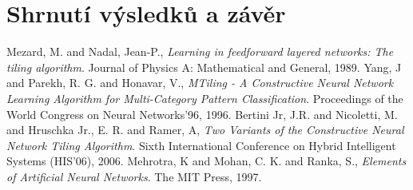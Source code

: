 \documentclass[a4paper, 11pt]{article}
\begin{document}
\section*{Shrnutí výsledků a závěr}

\begin{thebibliography}{9}
  Mezard, M. and Nadal, Jean-P.,
  \emph{Learning in feedforward layered networks: The tiling algorithm}.
  Journal of Physics A: Mathematical and General,
  1989.
  Yang, J and  Parekh, R. G. and Honavar, V.,
  \emph{MTiling - A Constructive Neural Network Learning Algorithm for Multi-Category Pattern Classification}.
  Proceedings of the World Congress on Neural Networks'96,
  1996.
  Bertini Jr, J.R. and Nicoletti, M. and Hruschka Jr., E. R. and Ramer, A,
  \emph{Two Variants of the Constructive Neural Network Tiling Algorithm}.
  Sixth International Conference on Hybrid Intelligent Systems (HIS'06),
  2006.
  Mehrotra, K and Mohan, C. K. and Ranka, S.,
  \emph{Elements of Artificial Neural Networks}.
  The MIT Press,
  1997.
\end{thebibliography}
\end{document}
